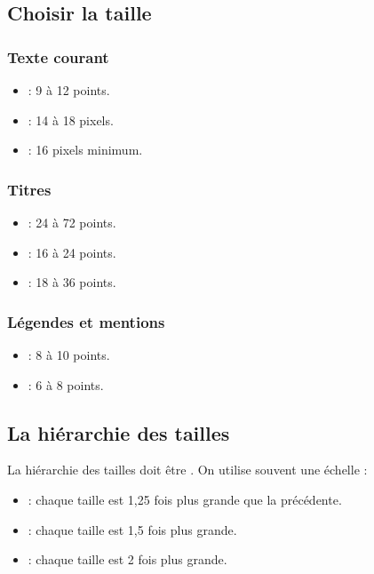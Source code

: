 \subsection{Choisir la taille}

\subsubsection{Texte courant}

\begin{itemize}
    \item {} : 9 à 12 points.
    \item {} : 14 à 18 pixels.
    \item {} : 16 pixels minimum.
\end{itemize}

\subsubsection{Titres}

\begin{itemize}
    \item {} : 24 à 72 points.
    \item {} : 16 à 24 points.
    \item {} : 18 à 36 points.
\end{itemize}

\subsubsection{Légendes et mentions}

\begin{itemize}
    \item {} : 8 à 10 points.
    \item {} : 6 à 8 points.
\end{itemize}

\subsection{La hiérarchie des tailles}

La hiérarchie des tailles doit être . On utilise souvent une échelle :

\begin{itemize}
    \item {} : chaque taille est 1,25 fois plus grande que la précédente.
    \item {} : chaque taille est 1,5 fois plus grande.
    \item {} : chaque taille est 2 fois plus grande.
\end{itemize}

